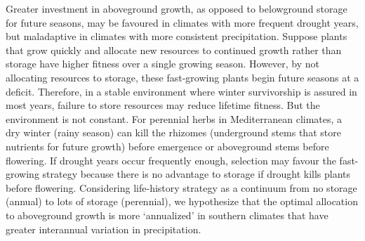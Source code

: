 \documentclass[11pt, oneside]{article}
\begin{document}
Greater investment in aboveground growth, as opposed to belowground storage for future seasons, may be favoured in climates with more frequent drought years, but maladaptive in climates with more consistent precipitation. Suppose plants that grow quickly and allocate new resources to continued growth rather than storage have higher fitness over a single growing season. However, by not allocating resources to storage, these fast-growing plants begin future seasons at a deficit. Therefore, in a stable environment where winter survivorship is assured in most years, failure to store resources may reduce lifetime fitness. But the environment is not constant. For perennial herbs in Mediterranean climates, a dry winter (rainy season) can kill the rhizomes (underground stems that store nutrients for future growth) before emergence or aboveground stems before flowering. If drought years occur frequently enough, selection may favour the fast-growing strategy because there is no advantage to storage if drought kills plants before flowering. Considering life-history strategy as a continuum from no storage (annual) to lots of storage (perennial), we hypothesize that the optimal allocation to aboveground growth is more ‘annualized’ in southern climates that have greater interannual variation in precipitation.
\end{document}
